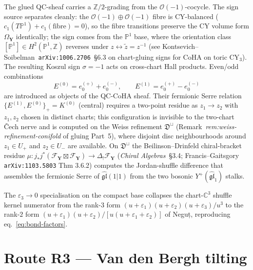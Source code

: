 \documentclass[11pt]{amsart}
\theoremstyle{definition}
\providecommand{\bY}{\mathbf{Y}}
\providecommand{\cO}{\mathcal{O}}
\providecommand{\cF}{\mathcal{F}}
\providecommand{\bZ}{\mathbb{Z}}
\providecommand{\bC}{\mathbb{C}}
\providecommand{\bP}{\mathbb{P}}
\providecommand{\fgl}{\mathfrak{gl}}
\providecommand{\fD}{\mathfrak{D}}
\begin{document}
The glued QC-sheaf carries a $\bZ/2$-grading from the $\cO(-1)$-cocycle.
The sign source separates cleanly: the $\cO(-1) \oplus \cO(-1)$ fibre is
CY-balanced ($c_1(T\bP^1) + c_1(\text{fibre}) = 0$), so the fibre
transitions preserve the CY volume form $\Omega_{\bY}$ identically; the
sign comes from the $\bP^1$ base, where the orientation class
$[\bP^1] \in H^2(\bP^1, \bZ)$ reverses under $z \leftrightarrow \tilde z
= z^{-1}$ (see Kontsevich--Soibelman~\texttt{arXiv:1006.2706}~\S6.3 on
chart-gluing signs for CoHA on toric CY$_3$). The resulting Koszul sign
$\sigma = -1$ acts on cross-chart Hall products. Even/odd combinations
\[
  E^{(0)} = e_0^{(+)} + e_0^{(-)},
  \qquad
  E^{(1)} = e_0^{(+)} - e_0^{(-)}
\]
are introduced as objects of the QC-CoHA sheaf. Their fermionic Serre
relation $\{E^{(1)}, E^{(0)}\}_+ = K^{(0)}$ (central) requires a two-point
residue as $z_1 \to z_2$ with $z_1, z_2$ chosen in distinct charts; this
configuration is invisible to the two-chart \v{C}ech nerve and is computed
on the Weiss refinement $\fD^{\sqcup}$ (Remark~\emph{rem:weiss-refinement-conifold}
of gluing Part~5), where disjoint disc neighbourhoods around
$z_1 \in U_+$ and $z_2 \in U_-$ are available. On $\fD^{\sqcup}$ the
Beilinson--Drinfeld chiral-bracket residue
$\mu \colon j_* j^* (\cF_{\bY} \boxtimes \cF_{\bY}) \to \Delta_! \cF_{\bY}$
(\emph{Chiral Algebras}~\S3.4; Francis--Gaitsgory
\texttt{arXiv:1103.5803} Thm 3.6.2) computes the Jordan-shuffle difference
that assembles the fermionic Serre of $\widehat{\fgl}(1|1)$ from the two
bosonic $Y^+(\widehat{\fgl}_1)$ stalks.

The $\varepsilon_3 \to 0$ specialisation on the compact base collapses the
chart-$\bC^3$ shuffle kernel numerator from the rank-$3$ form
$(u+\varepsilon_1)(u+\varepsilon_2)(u+\varepsilon_3)/u^3$ to the rank-$2$
form $(u+\varepsilon_1)(u+\varepsilon_2)/[u(u+\varepsilon_1+\varepsilon_2)]$
of Neguț, reproducing eq.~\eqref{eq:bond-factors}.

\section{Route R3 --- Van den Bergh tilting}
\label{sec:vdb-route}
\end{document}
